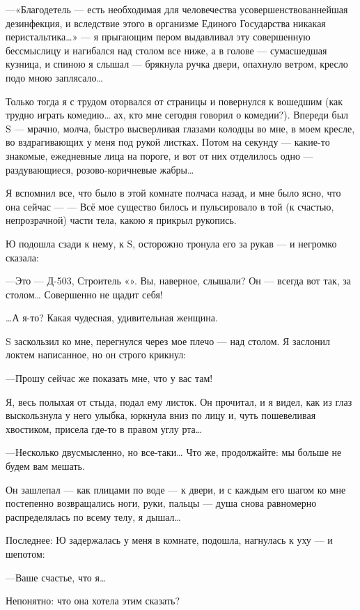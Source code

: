 \documentclass[11pt,openany]{book}
\begin{document}
---«Благодетель --- есть необходимая для человечества усовершенствованнейшая дезинфекция, и вследствие этого в организме Единого Государства никакая перистальтика\ldots{}» --- я прыгающим пером выдавливал эту совершенную бессмыслицу и нагибался над столом все ниже, а в голове --- сумасшедшая кузница, и спиною я слышал --- брякнула ручка двери, опахнуло ветром, кресло подо мною заплясало\ldots{}

Только тогда я с трудом оторвался от страницы и повернулся к вошедшим (как трудно играть комедию\ldots{} ах, кто мне сегодня говорил о комедии?). Впереди был S --- мрачно, молча, быстро высверливая глазами колодцы во мне, в моем кресле, во вздрагивающих у меня под рукой листках. Потом на секунду --- какие-то знакомые, ежедневные лица на пороге, и вот от них отделилось одно --- раздувающиеся, розово-коричневые жабры\ldots{}

Я вспомнил все, что было в этой комнате полчаса назад, и мне было ясно, что она сейчас --- --- Всё мое существо билось и пульсировало в той (к счастью, непрозрачной) части тела, какою я прикрыл рукопись.

Ю подошла сзади к нему, к S, осторожно тронула его за рукав --- и негромко сказала:

---Это --- Д-503, Строитель «». Вы, наверное, слышали? Он --- всегда вот так, за столом\ldots{} Совершенно не щадит себя!

\ldots{}А я-то? Какая чудесная, удивительная женщина.

S заскользил ко мне, перегнулся через мое плечо --- над столом. Я заслонил локтем написанное, но он строго крикнул:

---Прошу сейчас же показать мне, что у вас там!

Я, весь полыхая от стыда, подал ему листок. Он прочитал, и я видел, как из глаз выскользнула у него улыбка, юркнула вниз по лицу и, чуть пошевеливая хвостиком, присела где-то в правом углу рта\ldots{}

---Несколько двусмысленно, но все-таки\ldots{} Что же, продолжайте: мы больше не будем вам мешать.

Он зашлепал --- как плицами по воде --- к двери, и с каждым его шагом ко мне постепенно возвращались ноги, руки, пальцы --- душа снова равномерно распределялась по всему телу, я дышал\ldots{}

Последнее: Ю задержалась у меня в комнате, подошла, нагнулась к уху --- и шепотом:

---Ваше счастье, что я\ldots{}

Непонятно: что она хотела этим сказать?
\end{document}

